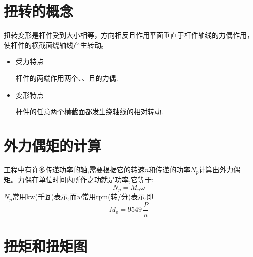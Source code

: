 \section{扭转的概念}
\vspace*{-1.5em}
\begin{definition}[扭转变形]
	扭转变形是杆件受到大小相等，方向相反且作用平面垂直于杆件轴线的力偶作用，使杆件的横截面绕轴线产生转动。
	\begin{itemize}
		\item 受力特点
		\par 杆件的两端作用两个、、且的力偶.
		\item 变形特点
		\par 杆件的任意两个横截面都发生绕轴线的相对转动.
	\end{itemize}
	\end{definition}

\section{外力偶矩的计算}
\vspace*{-1.5em}
\begin{theorem}[外力偶矩]
	工程中有许多传递功率的轴,需要根据它的转速$n$和传递的功率$N_p$计算出外力偶矩。力偶在单位时间内所作之功就是功率,它等于:
\begin{equation}
	N_p = M_n \omega
\end{equation}
$N_p$常用$\text{kw}$(千瓦)表示,而$w$常用$\text{rpm}$(转/分)表示.即
\begin{equation}
	M_\text{e}=9549\,\frac{P}{n}
\end{equation}
\end{theorem}

\section{扭矩和扭矩图}













